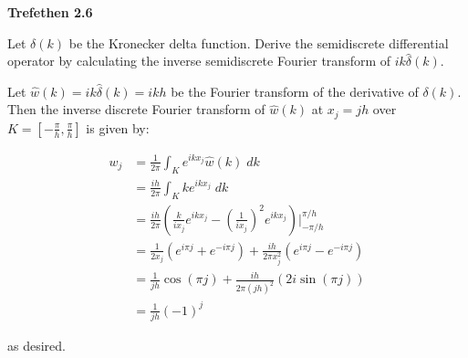 \textbf{Trefethen 2.6}

Let $\delta(k)$ be the Kronecker delta function. Derive the semidiscrete differential operator by calculating the 
inverse semidiscrete Fourier transform of $i k \hat{\delta}(k)$.

\begin{solution}
  Let $\hat{w}(k) = i k \hat{\delta}(k) = i k h$ be the Fourier transform of the derivative of $\delta(k)$. Then the 
  inverse discrete Fourier transform of $\hat{w}(k)$ at $x_j = jh$ over $K = [-\frac{\pi}{h}, \frac{\pi}{h}]$ is given 
  by:

  \begin{align*}
    w_j &= \frac{1}{2\pi} \int_K e^{i k x_j} \hat{w}(k)\; dk  \\
        &= \frac{i h}{2\pi} \int_K k e^{i k x_j}\; dk  \\
        &= \frac{i h}{2\pi} \left(\frac{k}{i x_j} e^{i k x_j} - \left(\frac{1}{i x_j}\right)^2 e^{i k x_j} \right) \bigg\vert_{-\pi/h}^{\pi/h}  \\
        &= \frac{1}{2 x_j} \left(e^{i \pi j} + e^{-i \pi j} \right) + \frac{ih}{2 \pi x_j^2}\left(e^{i \pi j} - e^{-i \pi j} \right) \\
        &= \frac{1}{jh} \cos{(\pi j)} + \frac{ih}{2 \pi (jh)^2} \left(2 i \sin{(\pi j)} \right) \\
        &= \frac{1}{jh} (-1)^j
  \end{align*}

  as desired.
  \ \\
\end{solution}